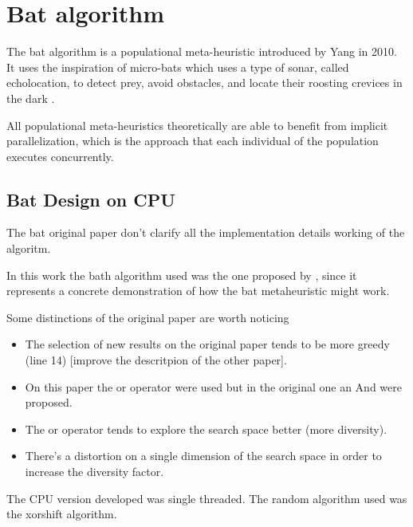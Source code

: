 \documentclass[conference]{IEEEtran}
\begin{document}
\section{Bat algorithm} \label{bat} %

The bat algorithm is a populational meta-heuristic introduced by Yang in
2010. It uses the inspiration of micro-bats which uses a type of sonar,
called echolocation, to detect prey, avoid obstacles, and locate their
roosting crevices in the dark \cite{original}.

All populational meta-heuristics theoretically are able to benefit from
implicit parallelization, which is the approach that each individual of
the population executes concurrently.

\subsection{Bat Design on CPU}

The bat original paper don't clarify all the implementation details
working of the algoritm.

In this work the bath algorithm used was the one proposed by
\cite{comparisonBatParpinelli}, since it represents a concrete demonstration of how
the bat metaheuristic might work.

Some distinctions of the original paper are worth noticing

\begin{itemize}
    \item The selection of new results on the original paper tends to be more greedy (line 14) [improve the descritpion of the other paper].
    \item On this paper the or operator were used but in the original one an And were proposed.
    \item The or operator tends to explore the search space better (more diversity).
    \item There's a distortion on a single dimension of the search space in
order to increase the diversity factor.
\end{itemize}

The CPU version developed was single threaded. The random algorithm used
was the xorshift algorithm.
\end{document}
